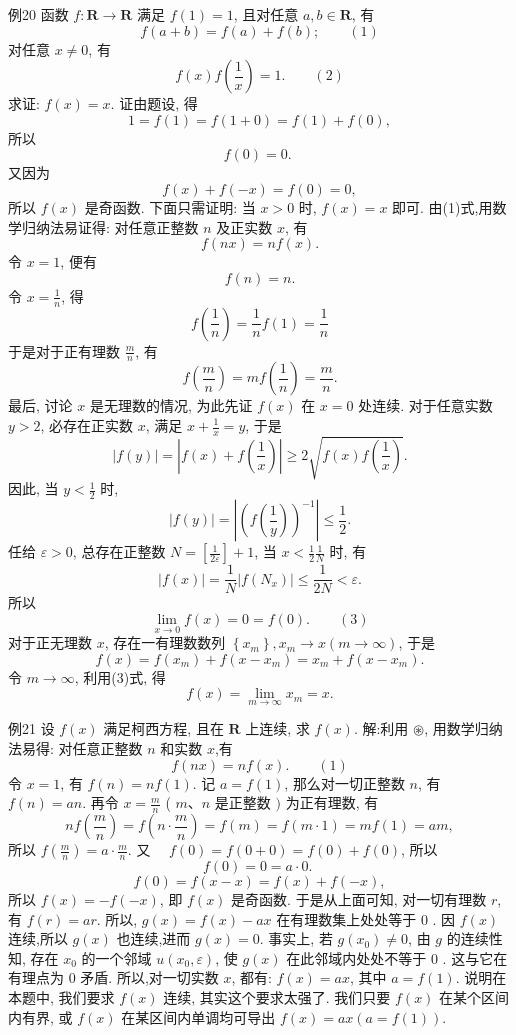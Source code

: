 例20 函数 $f: \mathbf{R} \rightarrow \mathbf{R}$ 满足 $f(1)=1$, 且对任意 $a, b \in \mathbf{R}$, 有
$$
f(a+b)=f(a)+f(b) ; \quad\quad (1)
$$
对任意 $x \neq 0$, 有
$$
f(x) f\left(\frac{1}{x}\right)=1 . \quad\quad (2)
$$
求证: $f(x)=x$.
证由题设, 得
$$
1=f(1)=f(1+0)=f(1)+f(0),
$$
所以
$$
f(0)=0 \text {. }
$$
又因为
$$
f(x)+f(-x)=f(0)=0,
$$
所以 $f(x)$ 是奇函数.
下面只需证明: 当 $x>0$ 时, $f(x)=x$ 即可.
由(1)式,用数学归纳法易证得: 对任意正整数 $n$ 及正实数 $x$, 有
$$
f(n x)=n f(x) .
$$
令 $x=1$, 便有
$$
f(n)=n .
$$
令 $x=\frac{1}{n}$, 得
$$
f\left(\frac{1}{n}\right)=\frac{1}{n} f(1)=\frac{1}{n}
$$
于是对于正有理数 $\frac{m}{n}$, 有
$$
f\left(\frac{m}{n}\right)=m f\left(\frac{1}{n}\right)=\frac{m}{n} .
$$
最后, 讨论 $x$ 是无理数的情况, 为此先证 $f(x)$ 在 $x=0$ 处连续.
对于任意实数 $y>2$, 必存在正实数 $x$, 满足 $x+\frac{1}{x}=y$, 于是
$$
|f(y)|=\left|f(x)+f\left(\frac{1}{x}\right)\right| \geqslant 2 \sqrt{f(x) f\left(\frac{1}{x}\right)} .
$$
因此, 当 $y<\frac{1}{2}$ 时,
$$
|f(y)|=\left|\left(f\left(\frac{1}{y}\right)\right)^{-1}\right| \leqslant \frac{1}{2} .
$$
任给 $\varepsilon>0$, 总存在正整数 $N=\left[\frac{1}{2 \varepsilon}\right]+1$, 当 $x<\frac{1}{2} \frac{1}{N}$ 时, 有
$$
|f(x)|=\frac{1}{N}\left|f\left(N_x\right)\right| \leqslant \frac{1}{2 N}<\varepsilon .
$$
所以
$$
\lim _{x \rightarrow 0} f(x)=0=f(0) . \quad\quad (3)
$$
对于正无理数 $x$, 存在一有理数数列 $\left\{x_m\right\}, x_m \rightarrow x(m \rightarrow \infty)$, 于是
$$
f(x)=f\left(x_m\right)+f\left(x-x_m\right)=x_m+f\left(x-x_m\right) .
$$
令 $m \rightarrow \infty$, 利用(3)式, 得
$$
f(x)=\lim _{m \rightarrow \infty} x_m=x . 
$$



例21 设 $f(x)$ 满足柯西方程, 且在 $\mathbf{R}$ 上连续, 求 $f(x)$.
解:利用 $\circledast$, 用数学归纳法易得: 对任意正整数 $n$ 和实数 $x$,有
$$
f(n x)=n f(x) . \quad\quad (1)
$$
令 $x=1$, 有 $f(n)=n f(1)$.
记 $a=f(1)$, 那么对一切正整数 $n$, 有 $f(n)=a n$.
再令 $x=\frac{m}{n}$ ( $m 、 n$ 是正整数 $)$ 为正有理数, 有
$$
n f\left(\frac{m}{n}\right)=f\left(n \cdot \frac{m}{n}\right)=f(m)=f(m \cdot 1)=m f(1)=a m,
$$
所以 $f\left(\frac{m}{n}\right)=a \cdot \frac{m}{n}$.
又 $\quad f(0)=f(0+0)=f(0)+f(0)$,
所以
$$
f(0)=0=a \cdot 0 \text {. }
$$
$$
f(0)=f(x-x)=f(x)+f(-x),
$$
所以 $f(x)=-f(-x)$,
即 $f(x)$ 是奇函数.
于是从上面可知, 对一切有理数 $r$, 有 $f(r)=a r$.
所以, $g(x)=f(x)-a x$ 在有理数集上处处等于 0 . 因 $f(x)$ 连续,所以 $g(x)$ 也连续,进而 $g(x)=0$.
事实上, 若 $g\left(x_0\right) \neq 0$, 由 $g$ 的连续性知, 存在 $x_0$ 的一个邻域 $u\left(x_0, \varepsilon\right)$, 使 $g(x)$ 在此邻域内处处不等于 0 . 这与它在有理点为 0 矛盾.
所以,对一切实数 $x$, 都有: $f(x)=a x$, 其中 $a=f(1)$.
说明在本题中, 我们要求 $f(x)$ 连续, 其实这个要求太强了.
我们只要 $f(x)$ 在某个区间内有界, 或 $f(x)$ 在某区间内单调均可导出 $f(x)=a x(a=f(1))$.



